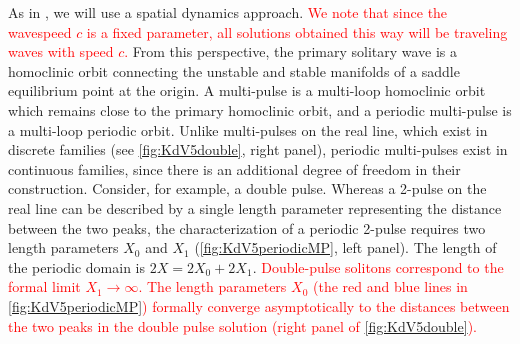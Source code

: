 \documentclass[12pt]{elsarticle}
\theoremstyle{plain}
\theoremstyle{definition}
\theoremstyle{remark}
\numberwithin{theorem}{section}
\numberwithin{equation}{section}
\newcommand{\revised}[1]{ \textcolor{red}{#1} }
\begin{document}
As in \cite{SandstedeStrut,Sandstede1998}, we will use a spatial dynamics approach. 
\revised{
We note that since the wavespeed $c$ is a fixed parameter, all solutions obtained this way will be traveling waves with speed $c$.
}
From this perspective, the primary solitary wave is a homoclinic orbit connecting the unstable and stable manifolds of a saddle equilibrium point at the origin. A multi-pulse is a multi-loop homoclinic orbit which remains close to the primary homoclinic orbit, and a periodic multi-pulse is a multi-loop periodic orbit. Unlike multi-pulses on the real line, which exist in discrete families (see \cref{fig:KdV5double}, right panel), periodic multi-pulses exist in continuous families, since there is an additional degree of freedom in their construction. Consider, for example, a double pulse. Whereas a 2-pulse on the real line can be described by a single length parameter representing the distance between the two peaks, the characterization of a periodic 2-pulse requires two length parameters $X_0$ and $X_1$ (\cref{fig:KdV5periodicMP}, left panel). The length of the periodic domain is $2X = 2X_0 + 2X_1$. 
\revised{
Double-pulse solitons correspond to the formal limit $X_1 \rightarrow \infty$. The length parameters $X_0$ (the red and blue lines in \cref{fig:KdV5periodicMP}) formally converge asymptotically to the distances between the two peaks in the double pulse solution (right panel of \cref{fig:KdV5double}).
}
\end{document}
